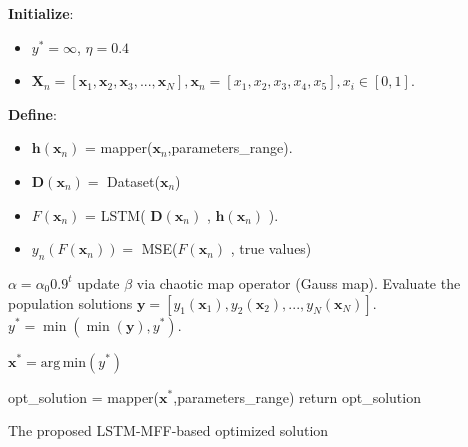 \documentclass[journal]{IEEEtran}
\begin{document}
\begin{algorithm}[htp]
		\SetAlgoLined
		\DontPrintSemicolon
		\textbf{Initialize}:
		\begin{itemize}
			\item  $y^* = \infty$, $\eta = 0.4$  
	
			\item  $\mathbf{X}_n=[\mathbf{x}_1,\mathbf{x}_2,\mathbf{x}_3,...,\mathbf{x}_N],
			\mathbf{x}_n =[x_1,x_2,x_3,x_4,x_5], x_i\in [0,1]$. 
		\end{itemize}
		\textbf{Define}:
		\begin{itemize}
			\item 
			$\mathbf{h}(\mathbf{x}_n)$ = mapper($\mathbf{x}_n$,parameters\_range).
			\item $\mathbf{D}(\mathbf{x}_n) =$ Dataset($\mathbf{x}_n$)
			\item $F(\mathbf{x}_n)$  = LSTM( $\mathbf{D}(\mathbf{x}_n)$ , $\mathbf{h}(\mathbf{x}_n)$ ).
 			\item $y_n(F(\mathbf{x}_n) ) = $ MSE($F(\mathbf{x}_n)$ , true values) 
		\end{itemize}
		
		{
				 $\alpha = \alpha_0 0.9^{t}$\;
				 update $\beta$ via chaotic map operator (Gauss map).\;
				 Evaluate the population solutions $\mathbf{y}=[y_1(\mathbf{x}_1),y_2(\mathbf{x}_2),...,y_N(\mathbf{x}_N)]$.
				 $y^* = \min( \min(\mathbf{y}), y^* )$.\; %
				
				 $\mathbf{x}^* =\mathrm{arg\,min}(y^*)$
				
				
		 }
		opt\_solution = mapper($\mathbf{x}^* $,parameters\_range)\;
		return opt\_solution 
		\caption{\centering The proposed LSTM-MFF-based optimized solution}
		\label{alg:WF}
	\end{algorithm}
\end{document}

